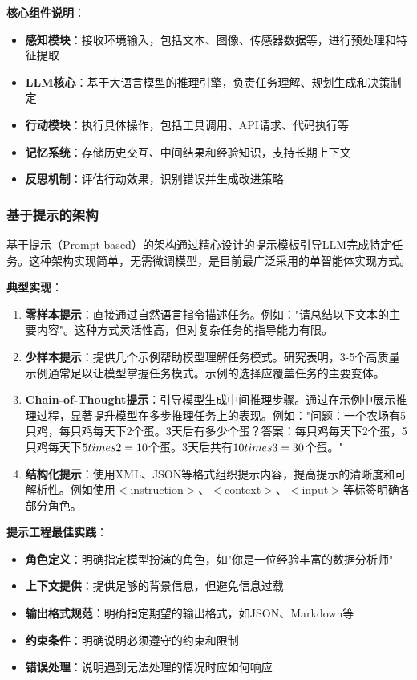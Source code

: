 \textbf{核心组件说明}：

\begin{itemize}[leftmargin=2em]
    \item \textbf{感知模块}：接收环境输入，包括文本、图像、传感器数据等，进行预处理和特征提取
    \item \textbf{LLM核心}：基于大语言模型的推理引擎，负责任务理解、规划生成和决策制定
    \item \textbf{行动模块}：执行具体操作，包括工具调用、API请求、代码执行等
    \item \textbf{记忆系统}：存储历史交互、中间结果和经验知识，支持长期上下文
    \item \textbf{反思机制}：评估行动效果，识别错误并生成改进策略
\end{itemize}

\subsubsection{基于提示的架构}

基于提示（Prompt-based）的架构通过精心设计的提示模板引导LLM完成特定任务。这种架构实现简单，无需微调模型，是目前最广泛采用的单智能体实现方式。

\textbf{典型实现}：
\begin{enumerate}[leftmargin=2em]
    \item \textbf{零样本提示}：直接通过自然语言指令描述任务。例如："请总结以下文本的主要内容"。这种方式灵活性高，但对复杂任务的指导能力有限。
    
    \item \textbf{少样本提示}：提供几个示例帮助模型理解任务模式。研究表明，3-5个高质量示例通常足以让模型掌握任务模式。示例的选择应覆盖任务的主要变体。
    
    \item \textbf{Chain-of-Thought提示}：引导模型生成中间推理步骤。通过在示例中展示推理过程，显著提升模型在多步推理任务上的表现。例如："问题：一个农场有5只鸡，每只鸡每天下2个蛋。3天后有多少个蛋？答案：每只鸡每天下2个蛋，5只鸡每天下$5 \\times 2 = 10$个蛋。3天后共有$10 \\times 3 = 30$个蛋。"
    
    \item \textbf{结构化提示}：使用XML、JSON等格式组织提示内容，提高提示的清晰度和可解析性。例如使用$<$instruction$>$、$<$context$>$、$<$input$>$等标签明确各部分角色。
\end{enumerate}

\textbf{提示工程最佳实践}：
\begin{itemize}[leftmargin=2em]
    \item \textbf{角色定义}：明确指定模型扮演的角色，如"你是一位经验丰富的数据分析师"
    \item \textbf{上下文提供}：提供足够的背景信息，但避免信息过载
    \item \textbf{输出格式规范}：明确指定期望的输出格式，如JSON、Markdown等
    \item \textbf{约束条件}：明确说明必须遵守的约束和限制
    \item \textbf{错误处理}：说明遇到无法处理的情况时应如何响应
\end{itemize}

